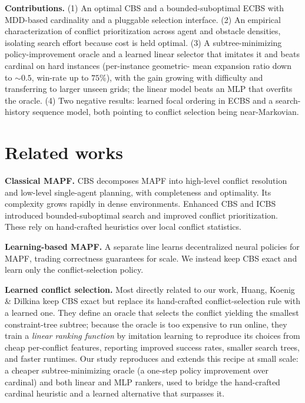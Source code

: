 \documentclass{article}
\theoremstyle{plain}
\theoremstyle{definition}
\theoremstyle{remark}
\begin{document}
\noindent\textbf{Contributions.}
(1) An optimal CBS and a bounded-suboptimal ECBS with MDD-based cardinality and
a pluggable selection interface.
(2) An empirical characterization of conflict prioritization across agent and
obstacle densities, isolating search effort because cost is held optimal.
(3) A subtree-minimizing policy-improvement oracle and a learned linear selector
that imitates it and beats cardinal on hard instances (per-instance geometric-
mean expansion ratio down to $\sim\!0.5$, win-rate up to $75\%$), with the gain
growing with difficulty and transferring to larger unseen grids; the linear model
beats an MLP that overfits the oracle.
(4) Two negative results: learned focal ordering in ECBS and a search-history
sequence model, both pointing to conflict selection being near-Markovian.
\vspace{-10pt}
\section{Related works}
\vspace{-10pt}
\textbf{Classical MAPF. }CBS \cite{sharon2015conflict} decomposes MAPF into high-level conflict resolution and low-level single-agent planning, with completeness and optimality. Its complexity grows rapidly in dense environments. Enhanced CBS \cite{barer2014suboptimal} and ICBS \cite{boyarski2015icbs} introduced bounded-suboptimal search and improved conflict prioritization. These rely on hand-crafted heuristics over local conflict statistics.

\textbf{Learning-based MAPF. }A separate line learns decentralized neural policies for MAPF, trading correctness guarantees for scale. We instead keep CBS exact and learn only the conflict-selection policy.

\textbf{Learned conflict selection. }Most directly related to our work, Huang, Koenig \& Dilkina \cite{Huang2020resolveconflictsforMAPF} keep CBS exact but replace its hand-crafted conflict-selection rule with a learned one. They define an oracle that selects the conflict yielding the smallest constraint-tree subtree; because the oracle is too expensive to run online, they train a \emph{linear ranking function} by imitation learning to reproduce its choices from cheap per-conflict features, reporting improved success rates, smaller search trees, and faster runtimes. Our study reproduces and extends this recipe at small scale: a cheaper subtree-minimizing oracle (a one-step policy improvement over cardinal) and both linear and MLP rankers, used to bridge the hand-crafted cardinal heuristic and a learned alternative that surpasses it.
\end{document}
